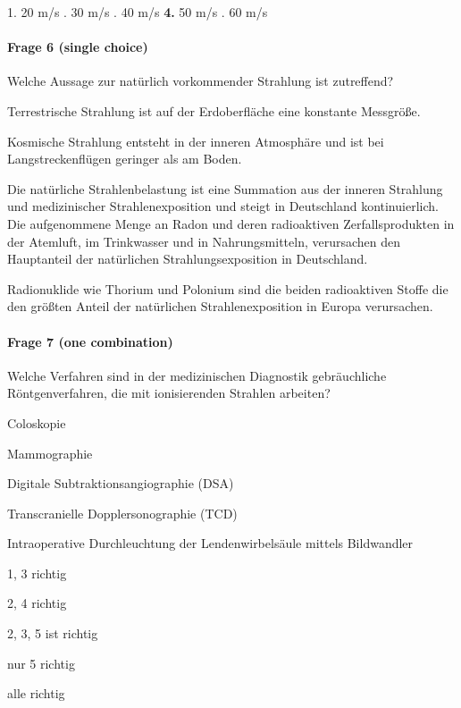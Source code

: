 1. 20 m/s . 30 m/s . 40 m/s \enskip \textbf{4.} 50 m/s . 60 m/s

\paragraph{Frage 6 (single choice)}

Welche Aussage zur natürlich vorkommender Strahlung ist zutreffend?
\begin{benumerate}
  \item Terrestrische Strahlung ist auf der Erdoberfläche eine konstante Messgröße.
  \item Kosmische Strahlung entsteht in der inneren Atmosphäre und ist bei Langstreckenflügen geringer als am Boden.
  \item Die natürliche Strahlenbelastung ist eine Summation aus der inneren Strahlung und medizinischer Strahlenexposition und steigt in Deutschland kontinuierlich.
  \bolditem Die aufgenommene Menge an Radon und deren radioaktiven Zerfallsprodukten in der Atemluft, im Trinkwasser und in Nahrungsmitteln, verursachen den Hauptanteil der natürlichen Strahlungsexposition in Deutschland.
  \item Radionuklide wie Thorium und Polonium sind die beiden radioaktiven Stoffe die den größten Anteil der natürlichen Strahlenexposition in Europa verursachen.
\end{benumerate}

\paragraph{Frage 7 (one combination)}

Welche Verfahren sind in der medizinischen Diagnostik gebräuchliche Röntgenverfahren, die mit ionisierenden Strahlen arbeiten?

\begin{minipage}{.65\linewidth}
  \begin{benumerate}
    \item Coloskopie
    \item Mammographie
    \item Digitale Subtraktionsangiographie (DSA)
    \item Transcranielle Dopplersonographie (TCD)
    \item Intraoperative Durchleuchtung der Lendenwirbelsäule mittels Bildwandler
  \end{benumerate}
\end{minipage}%
\begin{minipage}{.3\linewidth}
  \begin{checklist}[leftmargin=7mm]
    \item 1, 3 richtig
    \item 2, 4 richtig
    \item[\checkedbox] 2, 3, 5 ist richtig
    \item nur 5 richtig
    \item alle richtig
  \end{checklist}
\end{minipage}

